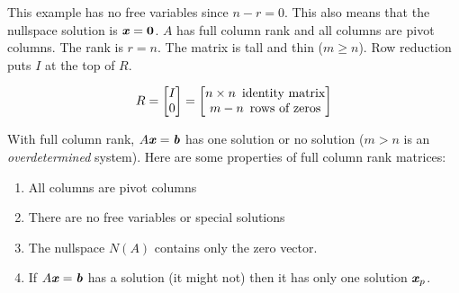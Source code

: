 \documentclass[12pt, letterpaper]{article}
\newcommand{\V}[1]{\textbf{\textit{#1}}}
\begin{document}
		This example has no free variables since $n-r=0$. This also means that the nullspace solution is $\V{x} = \textbf{0}$. $A$ has full column rank and all columns are pivot columns. The rank is $r=n$. The matrix is tall and thin ($m \ge n$). Row reduction puts $I$ at the top of $R$.
		
			$$R = \begin{bmatrix}
					I \\ 0
				\end{bmatrix} = \begin{bmatrix}
									n \times n \text{ \,identity matrix}\\m - n \text{ \,rows of zeros}
									\end{bmatrix}$$
	
	\noindent With full column rank, $A\V{x} = \V{b}$ has one solution or no solution ($m>n$ is an \textit{overdetermined} system). Here are some properties of full column rank matrices: 
		\begin{enumerate}
			\item All columns are pivot columns
			\item There are no free variables or special solutions
			\item The nullspace $N(A)$ contains only the zero vector.
			\item If $A\V{x} = \V{b}$ has a solution (it might not) then it has only one solution $\V{x}_p$.
		\end{enumerate}
	
\end{document}
